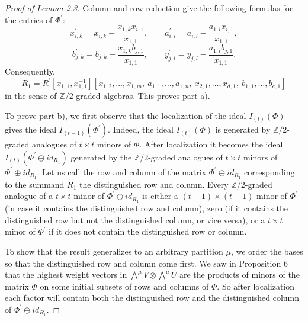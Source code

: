 \documentclass{tran-l}
\theoremstyle{plain}
\theoremstyle{remark}
\theoremstyle{definition}
\newcommand{\ZZ}{\mathbb {Z}}
\begin{document}
\begin{proof}[Proof of Lemma \textup{2.3}]
Column and row reduction give the following formulas
for the entries of $\Phi ^{\prime }$:
\begin{equation*}x_{i,k}^{\prime }=x_{i,k}-{{\frac{x_{1,k} x_{i,1}}{x_{1,1}}}},
\qquad a_{i,l}^{\prime }=a_{i,l}-{{\frac{a_{1,l} x_{i,1}}{x_{1,1}}}},
\end{equation*}
\begin{equation*}b_{j,k}^{\prime }=b_{j,k}-{{\frac{x_{1,k} b_{j,1}}{x_{1,1}}}},
\qquad y_{j,l}^{\prime }=y_{j,l}-{{\frac{a_{1,l} b_{j,1}}{x_{1,1}}}}.
\end{equation*}
Consequently,
\begin{equation*}R_{1} = R^{\prime }[x_{1,1}, x_{1,1}^{-1}][x_{1,2},\ldots ,x_{1,m},\
a_{1,1},\ldots ,a_{1,n},\  x_{2,1},\ldots ,x_{d,1},\
b_{1,1},\ldots ,b_{e,1}]
\end{equation*}
in the sense of $\ZZ /2$-graded algebras. This proves part a).

To prove part b), we first observe that the localization of the ideal $I_{(t
)}(\Phi )$ gives the ideal
$I_{(t-1)}(\Phi ^{\prime })$. Indeed, the ideal $I_{(t )}(\Phi )$
is generated by $\ZZ /2$-graded analogues of $t\times t$ minors of $\Phi $. After localization it becomes the ideal $I_{(t
)}(\Phi ^{\prime }\oplus id_{R_{1}} )$ generated by the $\ZZ /2$-graded analogues
of $t\times t$ minors of $\Phi ^{\prime }\oplus id_{R_{1}}$. Let us call the row and column of the matrix
 $\Phi ^{\prime }\oplus id_{R_{1}}$ corresponding to the summand $R_{1}$ the
distinguished row and column. 
Every $\ZZ /2$-graded analogue of a $t\times t$ minor of
$\Phi ^{\prime }\oplus id_{R_{1}}$ is either a $(t-1)\times (t-1)$ minor of
$\Phi ^{\prime }$ (in case it contains the distinguished row
and column), zero (if it contains the distinguished row but not the
distinguished column, or vice versa), or a $t\times t$
minor of $\Phi ^{\prime }$ if it does not contain the distinguished row or
column.

To show that the result generalizes to an arbitrary partition
$\mu $, we order the bases so that the
distinguished row and column come first. We saw
in Proposition 6 that the highest weight vectors in $\bigwedge ^{\mu }V\otimes \bigwedge ^{\mu }U$ are the products of minors of the matrix
$\Phi $ on
some initial subsets of rows and columns of $\Phi $. So
after localization each factor 
will contain both the distinguished row and
the distinguished column of $\Phi ^{\prime }\oplus id_{R_{1}}$.
\end{proof}
\end{document}
